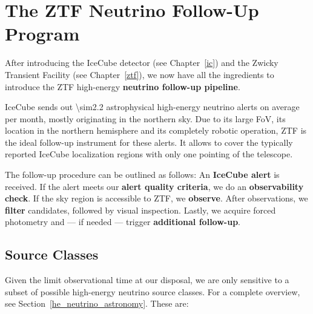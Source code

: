 \chapter{The ZTF Neutrino Follow-Up Program}\label{fupipeline}
After introducing the IceCube detector (see Chapter~\ref{ic}) and the Zwicky Transient Facility (see Chapter~\ref{ztf}), we now have all the ingredients to introduce the ZTF high-energy \textbf{neutrino follow-up pipeline}.

IceCube sends out \num{\sim2.2} astrophysical high-energy neutrino alerts on average per month, mostly originating in the northern sky. Due to its large FoV, its location in the northern hemisphere and its completely robotic operation, ZTF is the ideal follow-up instrument for these alerts. It allows to cover the typically reported IceCube localization regions with only one pointing of the telescope.

The follow-up procedure can be outlined as follows: An \textbf{IceCube alert} is received. If the alert meets our \textbf{alert quality criteria}, we do an \textbf{observability check}. If the sky region is accessible to ZTF, we \textbf{observe}. After observations, we \textbf{filter} candidates, followed by visual inspection. Lastly, we acquire forced photometry and --- if needed --- trigger \textbf{additional follow-up}.

\section{Source Classes}
Given the limit observational time at our disposal, we are only sensitive to a subset of possible high-energy neutrino source classes. For a complete overview, see Section~\ref{he_neutrino_astronomy}. These are:

